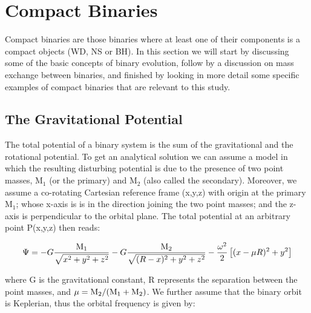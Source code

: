
\section[Compact Binaries]{Compact Binaries}\label{sec:cb}

Compact binaries are those binaries where at least one of their components is a compact objects (WD, NS or BH). In this section we will start by discussing some of the basic concepts of binary evolution, follow by a discussion on mass exchange between binaries,  and finished by looking in more detail some specific examples of compact binaries that are relevant to this study.   

\subsection{The Gravitational Potential}

The total potential of a binary system is the sum of the gravitational and the rotational potential. To get an analytical solution we can assume a model in which the resulting disturbing potential is due to the presence of two point masses, M$_1$ (or the primary) and M$_2$ (also called the secondary). Moreover, we assume a co-rotating Cartesian reference frame (x,y,z) with origin at the primary M$_1$; whose x-axis is is in the direction joining the two point masses; and the z-axis is perpendicular to the orbital plane. The total potential at an arbitrary point P(x,y,z) then reads:

\begin{equation}
        \Psi = - G \frac{\text M _1}{\sqrt{x^2+y^2+z^2}} - G \frac{\text M _2 }{\sqrt{(R - x)^2 + y^2 + z^2}} - \frac{\omega^2 }{2}  \left [ (x- \mu R )^2  + y^2 \right ]    
        \label{eq:pot}
\end{equation}

where G is the gravitational constant, R represents the separation between the point masses, and $\mu = \text M _2/(\text M _1 + \text M _2)$. We further assume that the binary orbit is Keplerian, thus the orbital frequency is given by:

